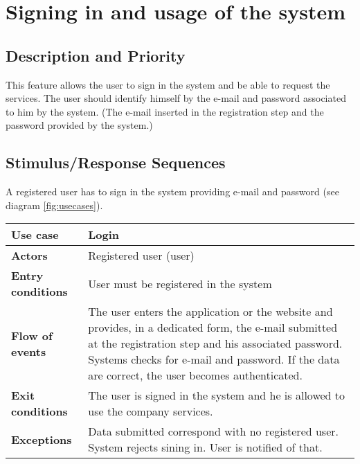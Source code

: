 \documentclass{scrreprt}
\begin{document}
\begin{comment}$<$Each requirement should be uniquely identified with a sequence number or a 
meaningful tag of some kind.$>$

REQ-1:	REQ-2:
\end{comment}

\section{Signing in and usage of the system}
\subsection{Description and Priority}
This feature allows the user to sign in the system and be able to request the services.
The user should identify himself by the e-mail and password associated to him by the system.
(The e-mail inserted in the registration step and the password provided by the system.)

\subsection{Stimulus/Response Sequences}
A registered user has to sign in the system providing e-mail and password (see diagram \vref{fig:usecases}).

\begin{center}
\begin{tabularx}{\columnwidth}{>{\bfseries}lX}
\toprule
Use case & Login\\
\midrule
Actors & Registered user (user)\\
\midrule
Entry conditions & User must be registered in the system\\
\midrule
Flow of events & The user enters the application or the website and provides, in a dedicated form, the e-mail submitted at the registration step and his associated password. Systems checks for e-mail and password. If the data are correct, the user becomes authenticated.\\
\midrule
Exit conditions & The user is signed in the system and he is allowed to use the company services.\\
\midrule
Exceptions & Data submitted correspond with no registered user. System rejects sining in. User is notified of that.\\
\bottomrule
\end{tabularx}
\end{center}
\end{document}
